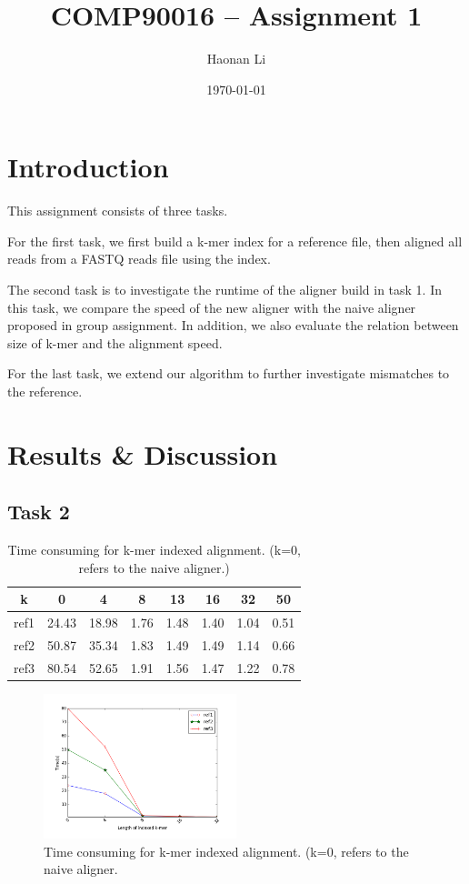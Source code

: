 \documentclass[a4paper]{article}
\title{\bfseries{COMP90016 -- Assignment 1 }}
\author{Haonan Li}
\date{\today}
\begin{document}
\maketitle

\section{Introduction}
\label{sec:introduction}

This assignment consists of three tasks. 

For the first task, we first build a k-mer index for a reference file, then aligned all reads from a FASTQ reads file using the index.

The second task is to investigate the runtime of the aligner build in task 1. In this task, we compare the speed of the new aligner with the naive aligner proposed in group assignment. In addition, we also evaluate the relation between size of k-mer and the alignment speed.

For the last task, we extend our algorithm to further investigate mismatches to the reference.

\section{Results \& Discussion}
\label{sec:experiment}
\subsection{Task 2}

\begin{table}[H]
	\centering
	\begin{tabular}{c|c|c|c|c|c|c|c}
		\hline
		k & 0 & 4 & 8 & 13 & 16 & 32 & 50 \\
		\hline
		ref1 & 24.43 & 18.98 & 1.76 & 1.48 & 1.40 & 1.04 & 0.51 \\
		\hline
		ref2 & 50.87 & 35.34 & 1.83 & 1.49 & 1.49 & 1.14 & 0.66 \\
		\hline
		ref3 & 80.54 & 52.65 & 1.91 & 1.56 & 1.47 & 1.22 & 0.78\\
		\hline
	\end{tabular}
	\caption{\label{tab:1}Time consuming for k-mer indexed alignment. (k=0, refers to  the naive aligner.)}
\end{table}

\begin{figure}[!htb]
	\centering
	\includegraphics[width=0.5\textwidth]{align_time.png}
	\caption{\label{fig:1}Time consuming for k-mer indexed alignment. (k=0, refers to  the naive aligner.}
\end{figure}
\end{document}
